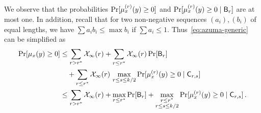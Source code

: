 We observe that the probabilities $\Pr[\mu_x^{(r)}(y) \geq 0]$ and $\Pr[\mu_x^{(r)}(y) \geq 0 \mid \mathsf{B}_r]$ are at most one. 
In addition, recall that for two non-negative sequences $(a_i), (b_i)$ of equal lengths, 
we have $\sum{a_i b_i} \leq \max b_i$ if $\sum{a_i} \leq 1$. 
Thus~\eqref{eq:azuma-generic} can be simplified as
\begin{align}\label{eq:three-terms}
\Pr[\mu_x(y) \geq 0] 
 &\leq 
    \sum_{r > r^*}{\mathcal{X}_\infty(r)} 
  + \sum_{r \leq r^*}{\mathcal{X}_\infty(r) \Pr[\mathsf{B}_r]} \nonumber \\
  &\quad+ \sum_{r \leq r^*}{\mathcal{X}_\infty(r)\, \max_{r \leq s \leq k/2}{\Pr[\mu_x^{(r)}(y) \geq 0 \mid \mathsf{C}_{r,s}]} }
  \nonumber \\
 &\leq    
      \sum_{r > r^*}{\mathcal{X}_\infty(r)}            
  + 
      \max_{r \leq r^*}{\Pr[\mathsf{B}_r]}          
  + 
      \max_{\substack{r \leq r^* \\ r \leq s \leq k/2}}{\Pr[\mu_x^{(r)}(y) \geq 0 \mid \mathsf{C}_{r,s}]}   
\, .
\end{align}


